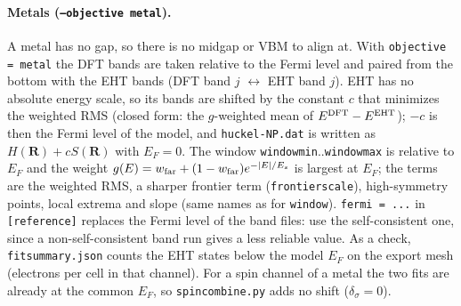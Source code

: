 \documentclass[11pt,a4paper]{article}
\newcommand{\cmd}[1]{\texttt{#1}}
\renewcommand{\_}{\origunderscore\allowbreak}
\begin{document}
\paragraph{Metals (\cmd{--objective metal}).} A metal has no gap, so there is no midgap or VBM to align at. With
\cmd{objective = metal} the DFT bands are taken relative to the Fermi level and paired from the bottom with the EHT bands
(DFT band $j$ $\leftrightarrow$ EHT band $j$). EHT has no absolute energy scale, so its bands are shifted by the constant
$c$ that minimizes the weighted RMS (closed form: the $g$-weighted mean of $E^{\rm DFT}-E^{\rm EHT}$); $-c$ is then the
Fermi level of the model, and \cmd{huckel-NP.dat} is written as $H(\mathbf R)+cS(\mathbf R)$ with $E_F=0$. The window
\cmd{window\_min}..\cmd{window\_max} is relative to $E_F$ and the weight $g(E)=w_{\rm far}+(1-w_{\rm far})e^{-|E|/E_s}$ is
largest at $E_F$; the terms are the weighted RMS, a sharper frontier term (\cmd{frontier\_scale}), high-symmetry points,
local extrema and slope (same names as for \cmd{window}). \cmd{fermi = ...} in \cmd{[reference]} replaces the Fermi level
of the band files: use the self-consistent one, since a non-self-consistent band run gives a less reliable value. As a
check, \cmd{fit\_summary.json} counts the EHT states below the model $E_F$ on the export mesh (electrons per cell in that
channel). For a spin channel of a metal the two fits are already at the common $E_F$, so \cmd{spin\_combine.py} adds no
shift ($\delta_\sigma=0$).
\end{document}
